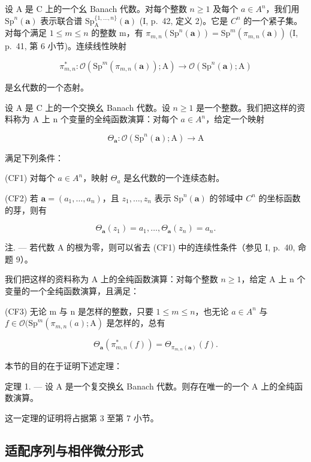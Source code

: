 设 A 是 C 上的一个幺 Banach 代数。对每个整数 \(n \geqslant 1\) 及每个 \(a \in A^{n}\)，我们用 \(\mathrm{Sp}^{n}(\boldsymbol{a})\) 表示联合谱 \(\mathrm{Sp}_{\mathrm{A}}^{\{1,\ldots,n\}}(\boldsymbol{a})\) (I, p.~42, 定义 2)。它是 \(C^{n}\) 的一个紧子集。对每个满足 \(1 \leqslant m \leqslant n\) 的整数 m，有 \(\pi_{m,n}(\mathrm{Sp}^{n}(\boldsymbol{a})) = \mathrm{Sp}^{m}(\pi_{m,n}(\boldsymbol{a}))\) (I, p.~41, 第 6 小节)。连续线性映射

\[
\pi_ {m, n} ^ {*} \colon \mathcal {O} (\mathrm{Sp} ^ {m} (\pi_ {m, n} (\boldsymbol {a})); \mathrm{A}) \longrightarrow \mathcal {O} (\mathrm{Sp} ^ {n} (\boldsymbol {a}); \mathrm{A})
\]

是幺代数的一个态射。

设 A 是 C 上的一个交换幺 Banach 代数。设 \(n \geqslant 1\) 是一个整数。我们把这样的资料称为 A 上 n 个变量的全纯函数演算：对每个 \(a \in A^{n}\)，给定一个映射

\[
\Theta_ {\boldsymbol {a}} \colon \mathcal {O} (\mathrm{Sp} ^ {n} (\boldsymbol {a}); \mathrm{A}) \longrightarrow \mathrm{A}
\]

满足下列条件：

(CF1) 对每个 \(a \in A^{n}\)，映射 \(\Theta_{a}\) 是幺代数的一个连续态射。

(CF2) 若 \(\boldsymbol{a}=(a_{1},\ldots,a_{n})\)，且 \(z_{1},\ldots,z_{n}\) 表示 \(\mathrm{Sp}^{n}(\boldsymbol{a})\) 的邻域中 \(C^{n}\) 的坐标函数的芽，则有

\[
\Theta_ {\boldsymbol {a}} (z _ {1}) = a _ {1}, \dots , \Theta_ {\boldsymbol {a}} (z _ {n}) = a _ {n}.
\]

注. --- 若代数 A 的根为零，则可以省去 (CF1) 中的连续性条件（参见 I, p.~40, 命题 9）。

我们把这样的资料称为 A 上的全纯函数演算：对每个整数 \(n \geqslant 1\)，给定 A 上 n 个变量的一个全纯函数演算，且满足：

(CF3) 无论 m 与 n 是怎样的整数，只要 \(1 \leqslant m \leqslant n\)，也无论 \(a \in A^{n}\) 与 \(f \in \mathcal{O}(\mathrm{Sp}^{m}(\pi_{m,n}(a); \mathrm{A})\) 是怎样的，总有

\[
\Theta_ {\boldsymbol {a}} (\pi_ {m, n} ^ {*} (f)) = \Theta_ {\pi_ {m, n} (\boldsymbol {a})} (f).
\]

本节的目的在于证明下述定理：

定理 1. --- 设 A 是一个复交换幺 Banach 代数。则存在唯一的一个 A 上的全纯函数演算。

这一定理的证明将占据第 3 至第 7 小节。

\subsection{适配序列与相伴微分形式}

